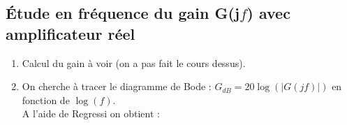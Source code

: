 \documentclass[11pt,a4paper]{article}
\begin{document}
\subsection{Étude en fréquence du gain G(j$f$) avec amplificateur réel}
\begin{enumerate}
\item Calcul du gain à voir (on a pas fait le cours dessus).
\item On cherche à tracer le diagramme de Bode : $G_{dB}=20 \log{(\left| G(jf)\right|)}$ en fonction de $\log{(f)}$.\\ A l'aide de Regressi on obtient :


\end{enumerate}
\end{document}
